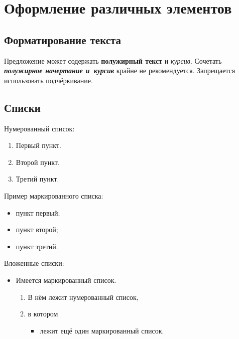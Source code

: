 \chapter{Оформление различных элементов}\label{ch:ch1}

\section{Форматирование текста}\label{sec:ch1/sec1}

Предложение может содержать \textbf{полужирный текст} и \textit{курсив}. 
Сочетать \textit{\textbf{полужирное начертание и~курсив}}
крайне не рекомендуется.
Запрещается использовать \uline{подчёркивание}. 


\section{Списки}\label{sec:ch1/sec2}

\noindent Нумерованный список:
\begin{enumerate}
    \item Первый пункт.
    \item Второй пункт.
    \item Третий пункт.
\end{enumerate}

\noindent Пример маркированного списка:
\begin{itemize}
    \item пункт первый;
    \item пункт второй;
    \item пункт третий.
\end{itemize}

\noindent Вложенные списки:
\begin{itemize}
    \item Имеется маркированный список.
          \begin{enumerate}
              \item В нём лежит нумерованный список,
              \item в котором
                    \begin{itemize}
                        \item лежит ещё один маркированный список.
                    \end{itemize}
          \end{enumerate}
\end{itemize}

